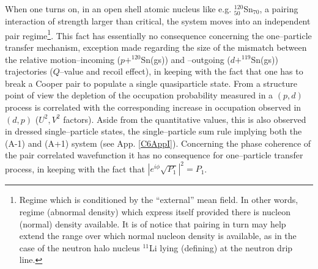When one turns on, in an open shell atomic nucleus like e.g. $^{120}_{50}$Sn$_{70}$, a pairing interaction of strength larger than critical, the system moves into an independent pair regime\footnote{Regime which is conditioned by the ``external'' mean field. In other words, regime (abnormal density) which express itself provided there is nucleon (normal) density available. It is of notice that pairing in turn may help extend the range over which normal nucleon density is available, as in the case of the neutron halo nucleus $^{11}$Li lying (defining) at the neutron drip line.}. This fact has essentially no consequence concerning the one--particle transfer mechanism, exception made regarding the size of the mismatch between the relative motion--incoming ($p+^{120}$Sn(gs)) and --outgoing ($d+^{119}$Sn(gs)) trajectories ($Q$--value and recoil effect), in keeping with the fact that one has to break a Cooper pair to populate a single  quasiparticle state. From a structure point of view the depletion of the occupation probability measured in a $(p,d)$ process is correlated with the corresponding increase in occupation observed in $(d,p)$ ($U^2,V^2$ factors). Aside  from the quantitative values, this is also observed in dressed single--particle states, the single--particle sum rule implying both the (A-1) and (A+1) system (see App. \ref{C6AppI}). Concerning the phase coherence of the pair correlated wavefunction it has no consequence for one--particle transfer process, in keeping with the fact that $|e^{i\phi}\sqrt{P_1}|^2=P_1$.


